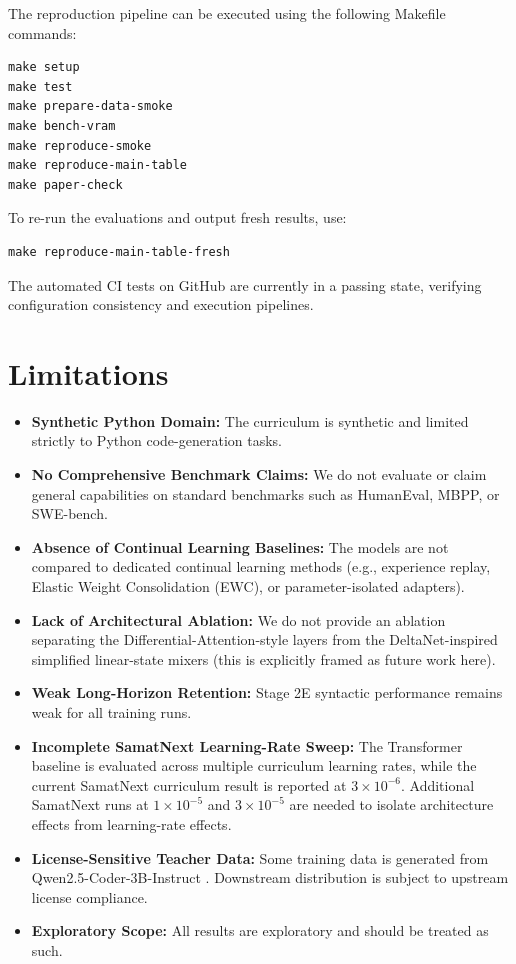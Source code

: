 \documentclass[11pt,a4paper]{article}
\begin{document}
The reproduction pipeline can be executed using the following Makefile commands:
\begin{verbatim}
make setup
make test
make prepare-data-smoke
make bench-vram
make reproduce-smoke
make reproduce-main-table
make paper-check
\end{verbatim}
To re-run the evaluations and output fresh results, use:
\begin{verbatim}
make reproduce-main-table-fresh
\end{verbatim}
The automated CI tests on GitHub are currently in a passing state, verifying configuration consistency and execution pipelines.

\section{Limitations}
\begin{itemize}
    \item \textbf{Synthetic Python Domain:} The curriculum is synthetic and limited strictly to Python code-generation tasks.
    \item \textbf{No Comprehensive Benchmark Claims:} We do not evaluate or claim general capabilities on standard benchmarks such as HumanEval, MBPP, or SWE-bench.
    \item \textbf{Absence of Continual Learning Baselines:} The models are not compared to dedicated continual learning methods (e.g., experience replay, Elastic Weight Consolidation (EWC), or parameter-isolated adapters).
    \item \textbf{Lack of Architectural Ablation:} We do not provide an ablation separating the Differential-Attention-style layers from the DeltaNet-inspired simplified linear-state mixers (this is explicitly framed as future work here).
    \item \textbf{Weak Long-Horizon Retention:} Stage 2E syntactic performance remains weak for all training runs.
    \item \textbf{Incomplete SamatNext Learning-Rate Sweep:} The Transformer baseline is evaluated across multiple curriculum learning rates, while the current SamatNext curriculum result is reported at $3\times 10^{-6}$. Additional SamatNext runs at $1\times 10^{-5}$ and $3\times 10^{-5}$ are needed to isolate architecture effects from learning-rate effects.
    \item \textbf{License-Sensitive Teacher Data:} Some training data is generated from Qwen2.5-Coder-3B-Instruct \cite{hui2024qwen}. Downstream distribution is subject to upstream license compliance.
    \item \textbf{Exploratory Scope:} All results are exploratory and should be treated as such.
\end{itemize}
\end{document}
